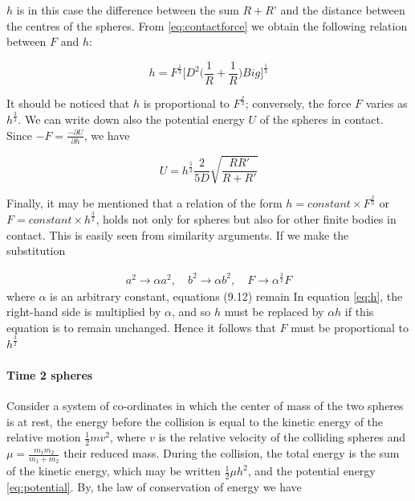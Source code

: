 $h$ is in this case the difference between the sum $R+R’$ and the distance between the centres of the spheres. From \ref{eq:contactforce} we obtain the following relation between $F$ and $h$:

\begin{equation}
h = F^{\frac{1}{3}} \Big[ D^{2} \Big( \frac{1}{R} + \frac{1}{R} \Big) Big]^{\frac{1}{3}}
\end{equation}

It should be noticed that $h$ is proportional to $F^{\frac{2}{3}}$; conversely, the force $F$ varies as $h^{\frac{3}{2}}$. We can write down also the potential energy $U$ of the spheres
in contact. Since $ -F = \frac{-\partial U}{\partial h}$, we have

\begin{equation}
U = h^{\frac{5}{2}} \frac{2}{5D} \sqrt{\frac{RR'}{R+R'}}
\label{eq:potential}
\end{equation}

Finally, it may be mentioned that a relation of the form $h = constant \times F^{\frac{2}{3}}$ or $F = constant \times h^{\frac{3}{2}}$, holds not only for spheres but also for other finite bodies in contact. This is easily seen from similarity arguments. If we make
the substitution

\begin{align*}
a^{2} \rightarrow \alpha a^{2}, \quad b^{2} \rightarrow \alpha b^{2}, \quad F \rightarrow \alpha^{\frac{3}{2}}F
\end{align*}
where $\alpha$ is an arbitrary constant, equations (9.12) remain  In
equation \ref{eq:h}, the right-hand side is multiplied by $\alpha$, and so $h$ must be replaced by $\alpha h$ if this equation is to remain unchanged. Hence it follows that $F$ must be proportional to $h^{\frac{3}{2}}$



\paragraph{Time 2 spheres}

Consider a system of co-ordinates in which the center of mass of the two spheres is at rest, the energy before the collision is equal to the kinetic energy of the relative motion $\frac{1}{2}mv^{2}$, where $v$ is the relative velocity of the colliding spheres and $\mu = \frac{m_{1}m_{2}}{m_{1} + m_{2}}$ their reduced mass. During the collision, the total energy is the sum of the kinetic energy, which may be written $\frac{1}{2}\mu h^{2}$, and the potential energy \ref{eq:potential}. By, the law of conservation of energy we have

